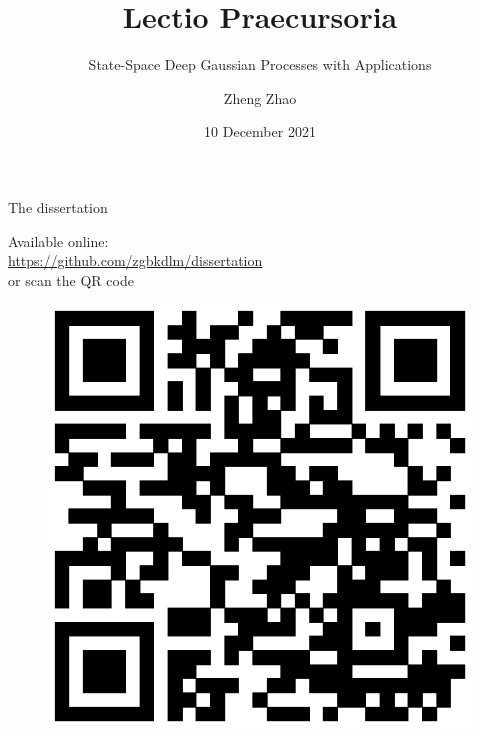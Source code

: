 \documentclass[seriffont, cmap=Beijing, 10pt]{zz}
\title{Lectio Praecursoria}
\subtitle{State-Space Deep Gaussian Processes with Applications}
\date[10 December 2021]{10 December 2021}
\institute{Aalto University}
\author[Zheng Zhao]{Zheng Zhao}
\begin{document}
\titlepage

\begin{frame}{The dissertation}
	\noindent
	\begin{minipage}{.48\textwidth}
		\begin{figure}
			\centering
		\end{figure}
	\end{minipage}
	\hfill
	\begin{minipage}{.48\textwidth}
		\begin{block}{}
			Available online:\\ \url{https://github.com/zgbkdlm/dissertation}\\
			or scan the QR code
		\end{block}
		\begin{block}{}
			\begin{figure}
				\centering
				\includegraphics[width=.5\linewidth]{figs/qr-code-thesis}

\end{figure}
\end{block}
\end{minipage}
\end{frame}
\end{document}
